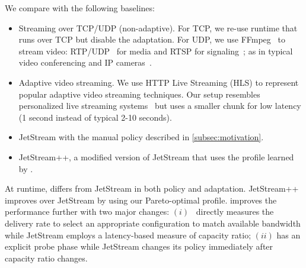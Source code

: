 We compare \sysname{} with the following baselines:

\begin{itemize}[noitemsep, nolistsep, leftmargin=*]

\item Streaming over TCP/UDP (non-adaptive). For TCP, we re-use \sysname{}
  runtime that runs over TCP but disable the adaptation. For UDP, we use
  FFmpeg~\cite{bellard2012ffmpeg} to stream video:
  RTP/UDP~\cite{schulzrinne2006rtp} for media and RTSP for
  signaling~\cite{schulzrinne1998rtsp}; as in typical video conferencing and IP
  cameras~\cite{durresi2005rtp, king2009cisco}.

\item Adaptive video streaming. We use HTTP Live Streaming (HLS) to represent
  popular adaptive video streaming techniques. Our setup resembles personalized
  live streaming systems~\cite{wang2016anatomy} but uses a smaller chunk for low
  latency (1 second instead of typical 2-10 seconds).

\item JetStream with the manual policy described in \autoref{subsec:motivation}.

\item JetStream++, a modified version of JetStream that uses the profile learned
  by \sysname{}.

\end{itemize}

At runtime, \sysname{} differs from JetStream in both policy and
adaptation. JetStream++ improves over JetStream by using our Pareto-optimal
profile. \sysname{} improves the performance further with two major changes:
$(i)$~\sysname{} directly measures the delivery rate to select an appropriate
configuration to match available bandwidth while JetStream employs a
latency-based measure of capacity ratio; $(ii)$ \sysname{} has an explicit probe
phase while JetStream changes its policy immediately after capacity ratio
changes.

\captionsetup[subfigure]{justification=justified, singlelinecheck=true}

